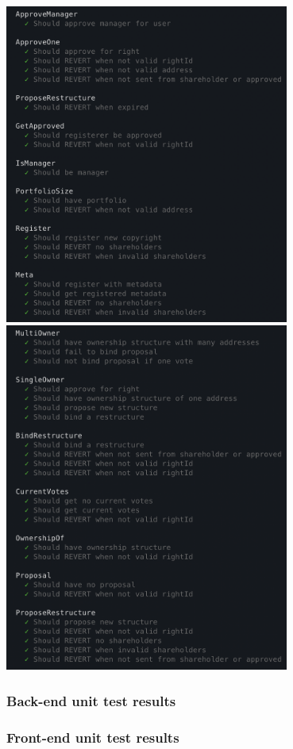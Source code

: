 \includegraphics[width=0.7\textwidth,height=\textheight,keepaspectratio]{images/appendix/tests/hardhat-1}
\vfill
\includegraphics[width=0.7\textwidth,height=\textheight,keepaspectratio]{images/appendix/tests/hardhat-2}

\subsubsection{Back-end unit test results}
\label{sec:test-results:back}



\subsubsection{Front-end unit test results}
\label{sec:test-results:front}


